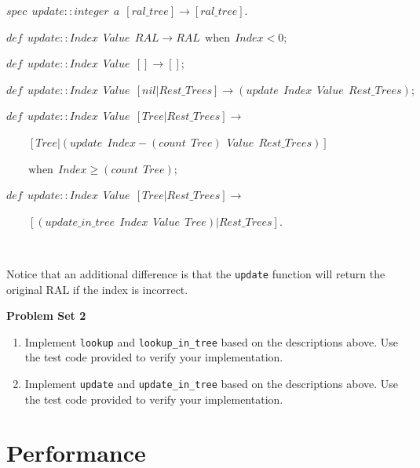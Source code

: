 \documentclass[
]{book}
\providecommand{\tightlist}{%
  \setlength{\itemsep}{0pt}\setlength{\parskip}{0pt}}
\begin{document}
\begin{formulabox}
\(spec ~ ~ update:: integer ~ ~ a ~ ~ [ral\_tree] \rightarrow [ral\_tree].\)

\(de\mathit{f} ~ ~ update:: Index ~ ~ Value ~ ~ RAL \rightarrow RAL ~ ~ \text{when} ~ ~ Index < 0;\)

\(de\mathit{f} ~ ~ update:: Index ~ ~ Value ~ ~ [] \rightarrow [];\)

\(de\mathit{f} ~ ~ update:: Index ~ ~ Value ~ ~ [nil|Rest\_Trees] \rightarrow (update ~ ~ Index ~ ~ Value ~ ~ Rest\_Trees);\)

\(de\mathit{f} ~ ~ update:: Index ~ ~ Value ~ ~ [Tree|Rest\_Trees] \rightarrow\)

\(\quad \quad [Tree|(update ~ ~ Index-(count ~ ~ Tree) ~ ~ Value ~ ~ Rest\_Trees)]\)

\(\quad \quad \text{when} ~ ~ Index \geq (count ~ ~ Tree);\)

\(de\mathit{f} ~ ~ update:: Index ~ ~ Value ~ ~ [Tree|Rest\_Trees] \rightarrow\)

\(\quad \quad [(update\_in\_tree ~ ~ Index ~ ~ Value ~ ~ Tree)|Rest\_Trees].\)

\end{formulabox}

\(\nonumber\)

Notice that an additional difference is that the \texttt{update} function will return the original RAL if the index is incorrect.

\begin{problembox}

\textbf{Problem Set 2}

\begin{enumerate}
\def\labelenumi{\arabic{enumi}.}
\tightlist
\item
  Implement \texttt{lookup} and \texttt{lookup\_in\_tree} based on the descriptions above. Use the test code provided to verify your implementation.
\item
  Implement \texttt{update} and \texttt{update\_in\_tree} based on the descriptions above. Use the test code provided to verify your implementation.
\end{enumerate}

\end{problembox}

\hypertarget{performance-1}{%
\section{Performance}\label{performance-1}}
\end{document}
